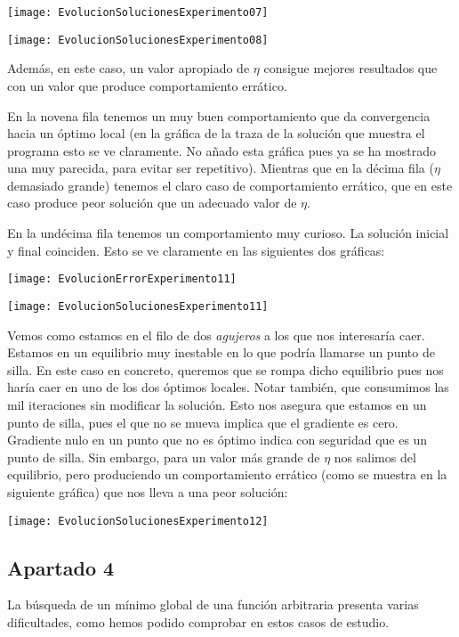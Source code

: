 \documentclass[11pt]{article}
\begin{document}
\texttt{[image: EvolucionSolucionesExperimento07]}

\texttt{[image: EvolucionSolucionesExperimento08]}

Además, en este caso, un valor apropiado de $\eta$ consigue mejores resultados que con un valor que produce comportamiento errático.

En la novena fila tenemos un muy buen comportamiento que da convergencia hacia un óptimo local (en la gráfica de la traza de la solución que muestra el programa esto se ve claramente. No añado esta gráfica pues ya se ha mostrado una muy parecida, para evitar ser repetitivo). Mientras que en la décima fila ($\eta$ demasiado grande) tenemos el claro caso de comportamiento errático, que en este caso produce peor solución que un adecuado valor de $\eta$.

En la undécima fila tenemos un comportamiento muy curioso. La solución inicial y final coinciden. Esto se ve claramente en las siguientes dos gráficas:

\texttt{[image: EvolucionErrorExperimento11]}

\texttt{[image: EvolucionSolucionesExperimento11]}

Vemos como estamos en el filo de dos \emph{agujeros} a los que nos interesaría caer. Estamos en un equilibrio muy inestable en lo que podría llamarse un punto de silla. En este caso en concreto, queremos que se rompa dicho equilibrio pues nos haría caer en uno de los dos óptimos locales. Notar también, que consumimos las mil iteraciones sin modificar la solución. Esto nos asegura que estamos en un punto de silla, pues el que no se mueva implica que el gradiente es cero. Gradiente nulo en un punto que no es óptimo indica con seguridad que es un punto de silla. Sin embargo, para un valor más grande de $\eta$ nos salimos del equilibrio, pero produciendo un comportamiento errático (como se muestra en la siguiente gráfica) que nos lleva a una peor solución:

\texttt{[image: EvolucionSolucionesExperimento12]}

\pagebreak

\subsection{Apartado 4}

La búsqueda de un mínimo global de una función arbitraria presenta varias dificultades, como hemos podido comprobar en estos casos de estudio.
\end{document}
